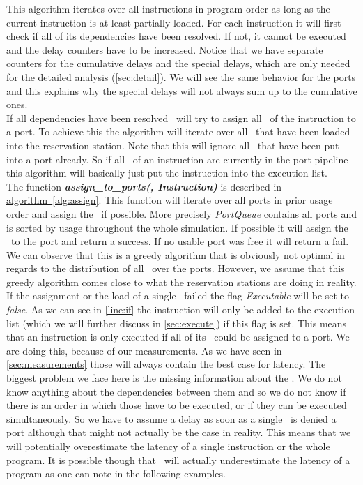 This algorithm iterates over all instructions in program order as long as the current instruction is at least partially loaded. For each instruction it will first check if all of its dependencies have been resolved. If not, it cannot be executed and the delay counters have to be increased. Notice that we have separate counters for the cumulative delays and the special delays, which are only needed for the detailed analysis (\autoref{sec:detail}). We will see the same behavior for the ports and this explains why the special delays will not always sum up to the cumulative ones.\\
If all dependencies have been resolved \suaca\ will try to assign all \microops\ of the instruction to a port. To achieve this the algorithm will iterate over all \microops\ that have been loaded into the reservation station. Note that this will ignore all \microops\ that have been put into a port already. So if all \microops\ of an instruction are currently in the port pipeline this algorithm will basically just put the instruction into the execution list.\\ 
The function \textbf{\emph{assign\_to\_ports(\microop, Instruction)}} is described in \hyperref[alg:assign]{algorithm~\ref*{alg:assign}}. This function will iterate over all ports in prior usage order and assign the \microop\ if possible. More precisely \emph{PortQueue} contains all ports and is sorted by usage throughout the whole simulation. If possible it will assign the \microop\ to the port and return a success. If no usable port was free it will return a fail.\\
We can observe that this is a greedy algorithm that is obviously not optimal in regards to the distribution of all \microops\ over the ports. However, we assume that this greedy algorithm comes close to what the reservation stations are doing in reality.\\
If the assignment or the load of a single \microop\ failed the flag \emph{Executable} will be set to \emph{false}. As we can see in \autoref{line:if} the instruction will only be added to the execution list (which we will further discuss in \autoref{sec:execute}) if this flag is set. This means that an instruction is only executed if all of its \microops\ could be assigned to a port. We are doing this, because of our measurements. As we have seen in \autoref{sec:measurements} those will always contain the best case for latency. The biggest problem we face here is the missing information about the \microops. We do not know anything about the dependencies between them and so we do not know if there is an order in which those have to be executed, or if they can be executed simultaneously. So we have to assume a delay as soon as a single \microop\ is denied a port although that might not actually be the case in reality. This means that we will potentially overestimate the latency of a single instruction or the whole program. It is possible though that \suaca\ will actually underestimate the latency of a program as one can note in the following examples.\\


